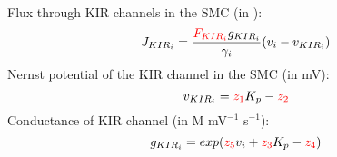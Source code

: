\documentclass[fleqn]{report}
\numberwithin{equation}{section}
\numberwithin{equation}{section}
\begin{document}
	\\
	Flux through KIR channels in the SMC (in \uMs): 
	\begin{equation} \label{eq:JKIRi}
	J_{KIR_{i}} =  \frac{\textcolor{red}{F_{KIR_{i}}} g_{KIR_{i}}}{\gamma_{i}}( v_{i} - v_{KIR_{i}})
	\end{equation}
	Nernst potential of the KIR channel in the SMC (in mV):
	\begin{equation}\label{eq:vKIR}
	v_{KIR_i} = \textcolor{red}{z_1} K_p-\textcolor{red}{z_2}
	\end{equation}
	Conductance of KIR channel (in  \textmu M mV$^{-1}$ s$^{-1}$):
	\begin{equation}\label{eq:gKIR}
	g_{KIR_i} = exp(\textcolor{red}{z_5}v_i +\textcolor{red}{z_3} K_p - \textcolor{red}{z_4})
	\end{equation}
\end{document}
